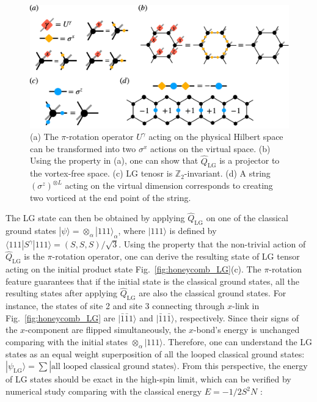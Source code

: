 \documentclass{ntuthesis}
\newcommand{\citep}{\cite}
\begin{document}
\begin{figure}[h]
 \centering
\includegraphics[width=\linewidth]{LG_property}
\caption{(a) The $\pi$-rotation operator $U^\gamma$ acting on the physical Hilbert space can be transformed into two $\sigma^x$ actions on the virtual space. (b) Using the property in (a), one can show that $\hat{Q}_{\text{LG}}$ is a projector to the vortex-free space. (c) LG tenosr is $\mathbb{Z}_2$-invariant. (d) A string  $(\sigma^z)^{\otimes L}$ acting on the virtual dimension corresponds to creating two vorticed at the end point of the string.} 
\label{fig:LG_property}
\end{figure}

The LG state can then be obtained by applying $\hat{Q}_{\text{LG}}$ on one of the classical ground states $|\psi \rangle = \otimes_\alpha |111\rangle_\alpha$, where $|111\rangle$ is defined by $\langle 111| S^\gamma |111\rangle = (S,S,S)/\sqrt{3}$. Using the property that the non-trivial action of $\hat{Q}_{\text{LG}}$ is the $\pi$-rotation operator, one can derive the resulting state of LG tensor acting on the initial product state Fig.~\ref{fig:honeycomb_LG}(c). The $\pi$-rotation feature guarantees that if the initial state is the classical ground states, all the resulting states after applying $\hat{Q}_{\text{LG}}$ are also the classical ground states. For instance, the states of site 2 and site 3 connecting through $x$-link in Fig.~\ref{fig:honeycomb_LG} are $|\bar{1}\bar{1}1 \rangle$ and $|\bar{1}1\bar{1}\rangle$, respectively. Since their signs of the $x$-component are flipped simultaneously, the $x$-bond's energy is unchanged comparing with the initial states $\otimes_\alpha|111\rangle$. Therefore, one can understand the LG states as an equal weight superposition of all the looped classical ground states: $| \psi_{\text{LG}} \rangle = \sum | \text{all looped classical ground states} \rangle$. From this perspective, the energy of LG states should be exact in the high-spin limit, which can be verified by numerical study comparing with the classical energy $E = -1/2S^2N$ \citep{Baskaran_2008}:
\end{document}
